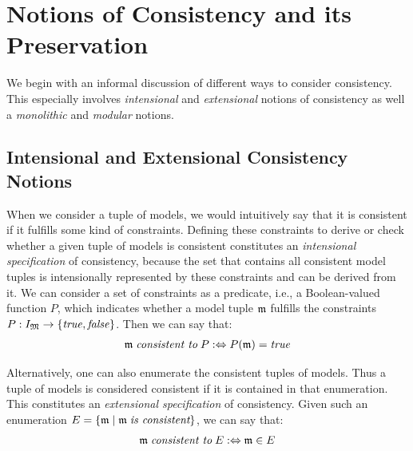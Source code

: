\section{Notions of Consistency and its Preservation}
\label{chap:correctness:notions_consistency}

We begin with an informal discussion of different ways to consider consistency. This especially involves \emph{intensional} and \emph{extensional} notions of consistency as well a \emph{monolithic} and \emph{modular} notions.

\subsection{Intensional and Extensional Consistency Notions}
\label{chap:correctness:notions_consistency:intensional_extensional}

When we consider a tuple of models, we would intuitively say that it is consistent if it fulfills some kind of constraints.
Defining these constraints to derive or check whether a given tuple of models is consistent constitutes an \emph{intensional specification} of consistency, because the set that contains all consistent model tuples is intensionally represented by these constraints and can be derived from it.
We can consider a set of constraints as a predicate, i.e., a Boolean-valued function $P$, which indicates whether a model tuple $\mathfrak{m}$ fulfills the constraints $P: I_{\mathfrak{M}} \rightarrow \{ \mathit{true}, \mathit{false} \}$. Then we can say that:
\begin{align*}
    \mathfrak{m} \; \textit{consistent to} \; P :\Leftrightarrow P(\mathfrak{m}) = \mathit{true}
\end{align*}

Alternatively, one can also enumerate the consistent tuples of models.
Thus a tuple of models is considered consistent if it is contained in that enumeration.
This constitutes an \emph{extensional specification} of consistency.
Given such an enumeration $E = \{ \mathfrak{m} \mid \mathfrak{m} \; \textit{is consistent} \}$, we can say that:
\begin{align*}
    \mathfrak{m} \; \textit{consistent to} \; E :\Leftrightarrow \mathfrak{m} \in E
\end{align*}

